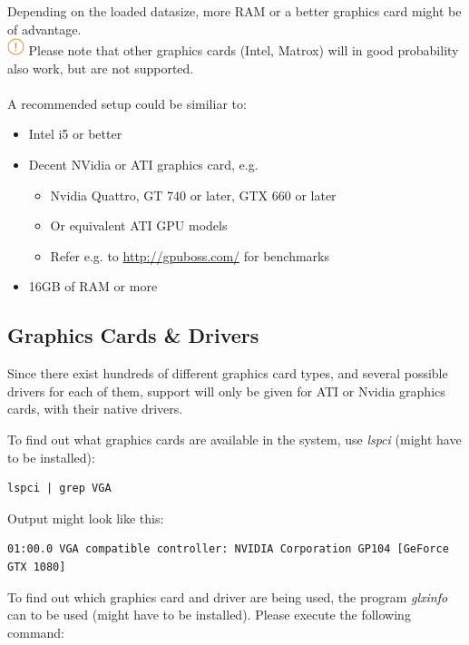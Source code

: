Depending on the loaded datasize, more RAM or a better graphics card might be of advantage. \\

\includegraphics[width=0.5cm]{../../data/icons/hint.png} Please note that other graphics cards (Intel, Matrox) will in good probability also work, but are not supported. \\\\

A recommended setup could be similiar to:

\begin{itemize}  
\item Intel i5 or better
\item Decent NVidia or ATI graphics card, e.g.
\begin{itemize}  
\item Nvidia Quattro, GT 740 or later, GTX 660 or later
\item Or equivalent ATI GPU models
\item Refer e.g. to \url{http://gpuboss.com/} for benchmarks
\end{itemize}
\item 16GB of RAM or more
\end{itemize}

\subsection{Graphics Cards \& Drivers}
\label{sec:graphics_installation}

Since there exist hundreds of different graphics card types, and several possible drivers for each of them, support will only be given for ATI or Nvidia graphics cards, with their native drivers.

To find out what graphics cards are available in the system, use \textit{lspci} (might have to be installed):

\begin{verbatim}
lspci | grep VGA
\end{verbatim}

Output might look like this:

\begin{verbatim}
01:00.0 VGA compatible controller: NVIDIA Corporation GP104 [GeForce GTX 1080]
\end{verbatim}

To find out which graphics card and driver are being used, the program \textit{glxinfo} can to be used (might have to be installed). Please execute the following command:

